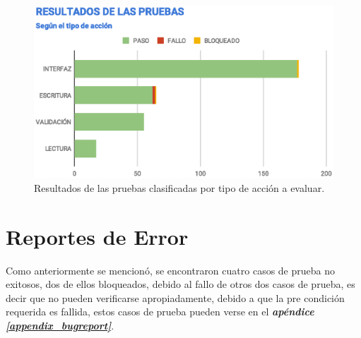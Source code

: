 \begin{figure}
\centering
\includegraphics[width=1.0\textwidth]{graphics/results-type.eps}
\caption{Resultados de las pruebas clasificadas por tipo de acción a evaluar.}
\label{results-type}
\end{figure}

\section{Reportes de Error}
Como anteriormente se mencionó, se encontraron cuatro casos de prueba no
exitosos, dos de ellos bloqueados, debido al fallo de otros dos casos de
prueba, es decir que no pueden verificarse apropiadamente, debido a que la
pre condición requerida es fallida, estos casos de prueba pueden verse en el
\emph{\textbf{apéndice \ref{appendix_bugreport}}}.

